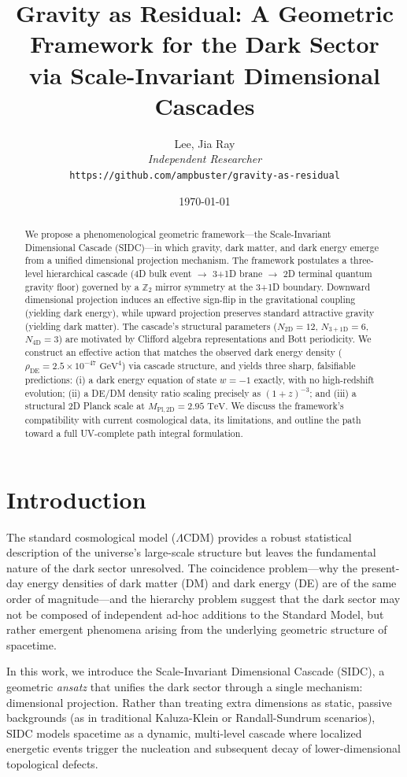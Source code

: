 \documentclass[12pt, a4paper]{article}
\title{\textbf{Gravity as Residual: A Geometric Framework for the Dark Sector \\ via Scale-Invariant Dimensional Cascades}}
\author{
    Lee, Jia Ray \\
    \textit{Independent Researcher} \\
    \texttt{https://github.com/ampbuster/gravity-as-residual}
}
\date{\today}
\newcommand{\mpld}[1]{M_{\text{Pl},#1\text{D}}}
\begin{document}
\maketitle

\begin{abstract}
We propose a phenomenological geometric framework—the Scale-Invariant Dimensional Cascade (SIDC)—in which gravity, dark matter, and dark energy emerge from a unified dimensional projection mechanism. The framework postulates a three-level hierarchical cascade (4D bulk event $\to$ 3+1D brane $\to$ 2D terminal quantum gravity floor) governed by a $\mathbb{Z}_{2}$ mirror symmetry at the 3+1D boundary. Downward dimensional projection induces an effective sign-flip in the gravitational coupling (yielding dark energy), while upward projection preserves standard attractive gravity (yielding dark matter). The cascade's structural parameters ($N_{2\text{D}} = 12$, $N_{3+1\text{D}} = 6$, $N_{4\text{D}} = 3$) are motivated by Clifford algebra representations and Bott periodicity. We construct an effective action that matches the observed dark energy density ($\rho_{\text{DE}} = 2.5 \times 10^{-47} \text{ GeV}^4$) via cascade structure, and yields three sharp, falsifiable predictions: (i) a dark energy equation of state $w = -1$ exactly, with no high-redshift evolution; (ii) a DE/DM density ratio scaling precisely as $(1+z)^{-3}$; and (iii) a structural 2D Planck scale at $\mpld{2} = 2.95 \text{ TeV}$. We discuss the framework's compatibility with current cosmological data, its limitations, and outline the path toward a full UV-complete path integral formulation.
\end{abstract}

\section{Introduction}
The standard cosmological model ($\Lambda$CDM) provides a robust statistical description of the universe's large-scale structure but leaves the fundamental nature of the dark sector unresolved. The coincidence problem—why the present-day energy densities of dark matter (DM) and dark energy (DE) are of the same order of magnitude—and the hierarchy problem suggest that the dark sector may not be composed of independent ad-hoc additions to the Standard Model, but rather emergent phenomena arising from the underlying geometric structure of spacetime.

In this work, we introduce the Scale-Invariant Dimensional Cascade (SIDC), a geometric \textit{ansatz} that unifies the dark sector through a single mechanism: dimensional projection. Rather than treating extra dimensions as static, passive backgrounds (as in traditional Kaluza-Klein or Randall-Sundrum scenarios), SIDC models spacetime as a dynamic, multi-level cascade where localized energetic events trigger the nucleation and subsequent decay of lower-dimensional topological defects. 
\end{document}
